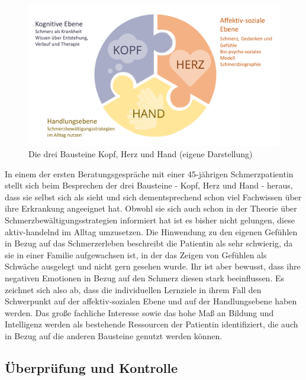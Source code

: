 \documentclass[
  twoside,
  parskip=half-,
]{scrreprt}
\begin{document}
 \begin{figure}
  \centering
  \includegraphics[width=1.1\textwidth]{Grafiken/KopfHerzHand.pdf}
  \caption{Die drei Bausteine Kopf, Herz und Hand (eigene Darstellung)}
  \label{fig:bausteine}
\end{figure}

\begin{beispiel}
  In einem der ersten Beratungsgespräche mit einer 45-jährigen Schmerzpatientin stellt sich beim Besprechen der drei Bausteine - Kopf, Herz und Hand - heraus, dass sie selbst sich als  sieht und sich dementsprechend schon viel Fachwissen über ihre Erkrankung angeeignet hat. Obwohl sie sich auch schon in der Theorie über Schmerzbewältigungsstrategien informiert hat ist es bisher nicht gelungen, diese aktiv-handelnd im Alltag umzusetzen. Die Hinwendung zu den eigenen Gefühlen in Bezug auf das Schmerzerleben beschreibt die Patientin als sehr schwierig, da sie in einer Familie aufgewachsen ist, in der das Zeigen von Gefühlen als Schwäche ausgelegt und nicht gern gesehen wurde. Ihr ist aber bewusst, dass ihre negativen Emotionen in Bezug auf den Schmerz diesen stark beeinflussen. Es zeichnet sich also ab, dass die individuellen Lernziele in ihrem Fall den Schwerpunkt auf der affektiv-sozialen Ebene und auf der Handlungsebene haben werden. Das große fachliche Interesse sowie das hohe Maß an Bildung und Intelligenz werden als bestehende Ressourcen der Patientin identifiziert, die auch in Bezug auf die anderen Bausteine genutzt werden können. 
\end{beispiel}

\subsection{Überprüfung und Kontrolle}
\end{document}
